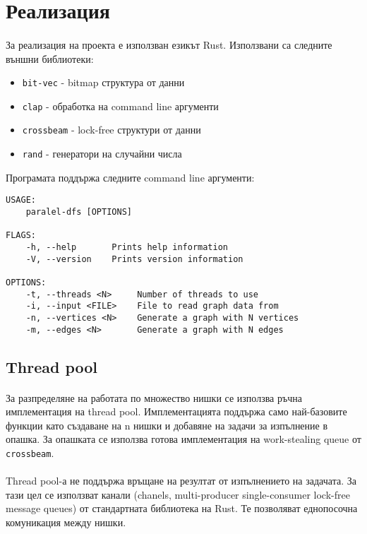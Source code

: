 \section{Реализация}

\paragraph*{} За реализация на проекта е използван езикът Rust. Използвани са следните външни библиотеки:
\begin{itemize}
\item \verb|bit-vec| - bitmap структура от данни
\item \verb|clap| - обработка на command line аргументи
\item \verb|crossbeam| - lock-free структури от данни
\item \verb|rand| - генератори на случайни числа
\end{itemize}

Програмата поддържа следните command line аргументи:
\begin{verbatim}
USAGE:
    paralel-dfs [OPTIONS]

FLAGS:
    -h, --help       Prints help information
    -V, --version    Prints version information

OPTIONS:
    -t, --threads <N>     Number of threads to use
    -i, --input <FILE>    File to read graph data from
    -n, --vertices <N>    Generate a graph with N vertices
    -m, --edges <N>       Generate a graph with N edges
\end{verbatim}

\subsection*{Thread pool}

\paragraph*{} За разпределяне на работата по множество нишки се използва ръчна имплементация на thread pool. Имплементацията поддържа само най-базовите функции като създаване на n нишки и добавяне на задачи за изпълнение в опашка. За опашката се използва готова имплементация на work-stealing queue от \verb|crossbeam|.

\paragraph*{} Thread pool-а не поддържа връщане на резултат от изпълнението на задачата. За тази цел се използват канали (chanels, multi-producer single-consumer lock-free message queues) от стандартната библиотека на Rust. Те позволяват еднопосочна комуникация между нишки.

